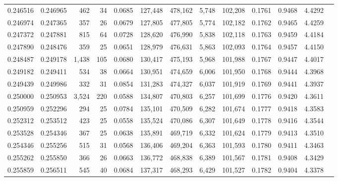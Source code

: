 \begin{tabular}{rrrrrrrrrrrrr}
0.246516 & 0.246965 &   462 &  34 &                                     0.0685 & 127,448 & 478,162 &   5,748 & 102,208 & 0.1761 & 0.9468 & 4.4292 \\
0.246974 & 0.247365 &   357 &  26 &                                     0.0679 & 127,805 & 477,805 &   5,774 & 102,182 & 0.1762 & 0.9465 & 4.4259 \\
0.247372 & 0.247881 &   815 &  64 &                                     0.0728 & 128,620 & 476,990 &   5,838 & 102,118 & 0.1763 & 0.9459 & 4.4184 \\
0.247890 & 0.248476 &   359 &  25 &                                     0.0651 & 128,979 & 476,631 &   5,863 & 102,093 & 0.1764 & 0.9457 & 4.4150 \\
0.248487 & 0.249178 & 1,438 & 105 &                                     0.0680 & 130,417 & 475,193 &   5,968 & 101,988 & 0.1767 & 0.9447 & 4.4017 \\
0.249182 & 0.249411 &   534 &  38 &                                     0.0664 & 130,951 & 474,659 &   6,006 & 101,950 & 0.1768 & 0.9444 & 4.3968 \\
0.249439 & 0.249986 &   332 &  31 &                                     0.0854 & 131,283 & 474,327 &   6,037 & 101,919 & 0.1769 & 0.9441 & 4.3937 \\
0.250000 & 0.250953 & 3,524 & 220 &                                     0.0588 & 134,807 & 470,803 &   6,257 & 101,699 & 0.1776 & 0.9420 & 4.3611 \\
0.250959 & 0.252296 &   294 &  25 &                                     0.0784 & 135,101 & 470,509 &   6,282 & 101,674 & 0.1777 & 0.9418 & 4.3583 \\
0.252312 & 0.253512 &   423 &  25 &                                     0.0558 & 135,524 & 470,086 &   6,307 & 101,649 & 0.1778 & 0.9416 & 4.3544 \\
0.253528 & 0.254346 &   367 &  25 &                                     0.0638 & 135,891 & 469,719 &   6,332 & 101,624 & 0.1779 & 0.9413 & 4.3510 \\
0.254346 & 0.255256 &   515 &  31 &                                     0.0568 & 136,406 & 469,204 &   6,363 & 101,593 & 0.1780 & 0.9411 & 4.3463 \\
0.255262 & 0.255850 &   366 &  26 &                                     0.0663 & 136,772 & 468,838 &   6,389 & 101,567 & 0.1781 & 0.9408 & 4.3429 \\
0.255859 & 0.256511 &   545 &  40 &                                     0.0684 & 137,317 & 468,293 &   6,429 & 101,527 & 0.1782 & 0.9404 & 4.3378 \\

\end{tabular}
